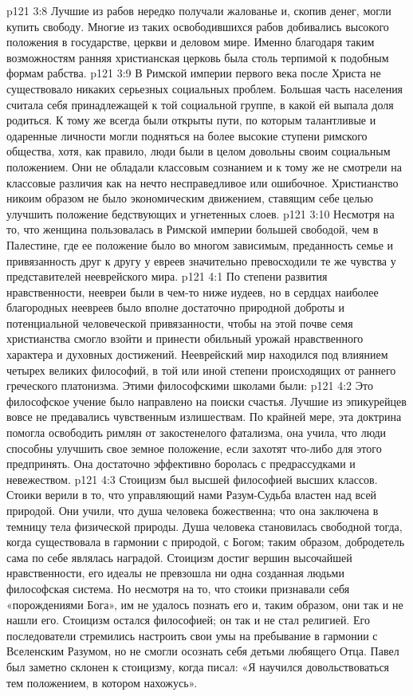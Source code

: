 \vs p121 3:8 Лучшие из рабов нередко получали жалованье и, скопив денег, могли купить свободу. Многие из таких освободившихся рабов добивались высокого положения в государстве, церкви и деловом мире. Именно благодаря таким возможностям ранняя христианская церковь была столь терпимой к подобным формам рабства.
\vs p121 3:9 \pc В Римской империи первого века после Христа не существовало никаких серьезных социальных проблем. Большая часть населения считала себя принадлежащей к той социальной группе, в какой ей выпала доля родиться. К тому же всегда были открыты пути, по которым талантливые и одаренные личности могли подняться на более высокие ступени римского общества, хотя, как правило, люди были в целом довольны своим социальным положением. Они не обладали классовым сознанием и к тому же не смотрели на классовые различия как на нечто несправедливое или ошибочное. Христианство никоим образом не было экономическим движением, ставящим себе целью улучшить положение бедствующих и угнетенных слоев.
\vs p121 3:10 Несмотря на то, что женщина пользовалась в Римской империи большей свободой, чем в Палестине, где ее положение было во многом зависимым, преданность семье и привязанность друг к другу у евреев значительно превосходили те же чувства у представителей нееврейского мира.
\vs p121 4:1 По степени развития нравственности, неевреи были в чем\hyp{}то ниже иудеев, но в сердцах наиболее благородных неевреев было вполне достаточно природной доброты и потенциальной человеческой привязанности, чтобы на этой почве семя христианства смогло взойти и принести обильный урожай нравственного характера и духовных достижений. Нееврейский мир находился под влиянием четырех великих философий, в той или иной степени происходящих от раннего греческого платонизма. Этими философскими школами были:
\vs p121 4:2 \bibnobreakspace {} Это философское учение было направлено на поиски счастья. Лучшие из эпикурейцев вовсе не предавались чувственным излишествам. По крайней мере, эта доктрина помогла освободить римлян от закостенелого фатализма, она учила, что люди способны улучшить свое земное положение, если захотят что\hyp{}либо для этого предпринять. Она достаточно эффективно боролась с предрассудками и невежеством.
\vs p121 4:3 \bibnobreakspace {} Стоицизм был высшей философией высших классов. Стоики верили в то, что управляющий нами Разум\hyp{}Судьба властен над всей природой. Они учили, что душа человека божественна; что она заключена в темницу тела физической природы. Душа человека становилась свободной тогда, когда существовала в гармонии с природой, с Богом; таким образом, добродетель сама по себе являлась наградой. Стоицизм достиг вершин высочайшей нравственности, его идеалы не превзошла ни одна созданная людьми философская система. Но несмотря на то, что стоики признавали себя «порождениями Бога», им не удалось познать его и, таким образом, они так и не нашли его. Стоицизм остался философией; он так и не стал религией. Его последователи стремились настроить свои умы на пребывание в гармонии с Вселенским Разумом, но не смогли осознать себя детьми любящего Отца. Павел был заметно склонен к стоицизму, когда писал: «Я научился довольствоваться тем положением, в котором нахожусь».
